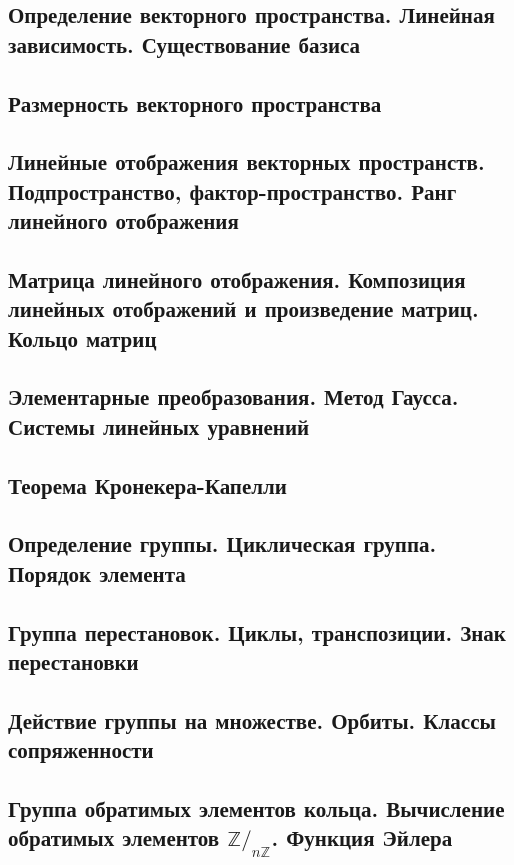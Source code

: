 \documentclass[a4paper,100pt]{article}
\theoremstyle{indented}
\theoremstyle{definition}
\theoremstyle{remark}
\begin{document}
\subsection{Определение векторного пространства. Линейная зависимость. Существование базиса}

\subsection{Размерность векторного пространства}

\subsection{Линейные отображения векторных пространств. Подпространство, фактор-пространство. Ранг линейного отображения}

\subsection{Матрица линейного отображения. Композиция линейных отображений и произведение матриц. Кольцо матриц}

\subsection{Элементарные преобразования. Метод Гаусса. Системы линейных уравнений}

\subsection{Теорема Кронекера-Капелли}

\subsection{Определение группы. Циклическая группа. Порядок элемента}

\subsection{Группа перестановок. Циклы, транспозиции. Знак перестановки}

\subsection{Действие группы на множестве. Орбиты. Классы сопряженности}

\subsection{Группа обратимых элементов кольца. Вычисление обратимых элементов $\mathbb{Z}/_{n\mathbb{Z}}$. Функция Эйлера}
\end{document}
